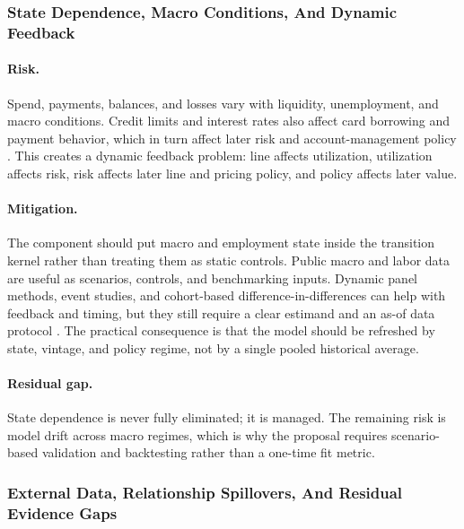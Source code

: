\documentclass[11pt]{article}
\newcommand{\1}{\mathbf{1}}
\begin{document}
\subsubsection{State Dependence, Macro Conditions, And Dynamic Feedback}

\paragraph{Risk.}
Spend, payments, balances, and losses vary with liquidity, unemployment, and
macro conditions. Credit limits and interest rates also affect card borrowing
and payment behavior, which in turn affect later risk and account-management
policy \citep{ganong2019unemployment,gross2001liquidity,johnson2004rebates,
baker2020epidemic}. This creates a dynamic feedback problem: line affects
utilization, utilization affects risk, risk affects later line and pricing
policy, and policy affects later value.

\paragraph{Mitigation.}
The component should put macro and employment state inside the transition
kernel rather than treating them as static controls. Public macro and labor
data are useful as scenarios, controls, and benchmarking inputs. Dynamic panel
methods, event studies, and cohort-based difference-in-differences can help
with feedback and timing, but they still require a clear estimand and an as-of
data protocol \citep{arellano1991panel,blundell1998initial,
callaway2021did,sun2021eventstudy}. The practical consequence is that the
model should be refreshed by state, vintage, and policy regime, not by a
single pooled historical average.

\paragraph{Residual gap.}
State dependence is never fully eliminated; it is managed. The remaining risk
is model drift across macro regimes, which is why the proposal requires
scenario-based validation and backtesting rather than a one-time fit metric.

\subsubsection{External Data, Relationship Spillovers, And Residual Evidence Gaps}
\end{document}
